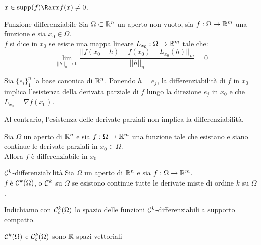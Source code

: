 \documentclass{book}
\begin{document}
\begin{remark}{}{}
    $x \in \supp(f) \Rarr f(x)\neq 0$.
\end{remark}

\begin{definition}{Funzione differenziabile}{}
    Sia $\Omega\subset \mathbb{R}^n$ un aperto non vuoto, sia $f:\Omega\to\mathbb{R}^m$ una funzione e sia $x_0\in\Omega$.\\
    $f$ si dice  in $x_0$ se esiste una mappa lineare $L_{x_0} : \Omega\to\mathbb{R}^m$ tale che:
    \[\lim_{||h||_n \to 0} \frac{||f(x_0 + h) - f(x_0) - L_{x_0}(h)||_m}{||h||_n} = 0\]
\end{definition}

\begin{remark}{}{}
    Sia $\{e_i\}_1^n$ la base canonica di $\mathbb{R}^n$. Ponendo $h=e_j$, la differenziabilità di $f$ in $x_0$ implica l'esistenza della derivata parziale di $f$ lungo la direzione $e_j$ in $x_0$ e che $L_{x_0} = \nabla f (x_0)$.
\end{remark}

\begin{remark}{}{}
    Al contrario, l'esistenza delle derivate parziali non implica la differenziabilità.
\end{remark}

\begin{proposition}{}{}
    Sia $\Omega$ un aperto di $\mathbb{R}^n$ e sia $f:\Omega\to\mathbb{R}^m$ una funzione tale che esistano e siano continue le derivate parziali in $x_0\in\Omega$.\\
    Allora $f$ è differenziabile in $x_0$
\end{proposition}

\begin{definition}{$\mathcal{C}^k$-differenziabilità}{}
    Sia $\Omega$ un aperto di $\mathbb{R}^n$ e sia $f:\Omega\to\mathbb{R}^m$.\\
    $f$ è $\mathcal{C}^k(\Omega)$, o $\mathcal{C}^k$ su $\Omega$ se esistono continue tutte le derivate miste di ordine $k$ su $\Omega$.
\end{definition}

\begin{notation}
    Indichiamo con $\mathcal{C}_c^k(\Omega)$ lo spazio delle funzioni $\mathcal{C}^k$-differenziabili a supporto compatto.
\end{notation}

\begin{remark}{}{}
    $\mathcal{C}^k(\Omega)$ e $\mathcal{C}_c^k(\Omega)$ sono $\mathbb{R}$-spazi vettoriali
\end{remark}
\end{document}

